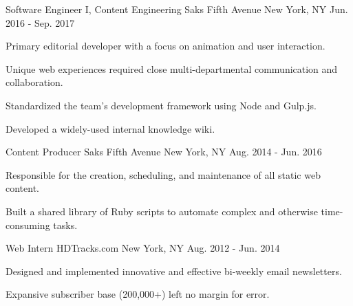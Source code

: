 \begin{cventries}
  \cventry
    {Software Engineer I, Content Engineering} %
    {Saks Fifth Avenue} %
    {New York, NY} %
    {Jun. 2016 - Sep. 2017} %
    {
      \begin{cvitems} %
       \item {Primary editorial developer with a focus on animation and user interaction.}
       \item {Unique web experiences required close multi-departmental communication and collaboration.}
       \item {Standardized the team's development framework using Node and Gulp.js.}
       \item {Developed a widely-used internal knowledge wiki.}
      \end{cvitems}
    }    

  \cventry
    {Content Producer} %
    {Saks Fifth Avenue} %
    {New York, NY} %
    {Aug. 2014 - Jun. 2016} %
    {
      \begin{cvitems} %
        \item {Responsible for the creation, scheduling, and maintenance of all static web content.}
        \item {Built a shared library of Ruby scripts to automate complex and otherwise time-consuming tasks.}
      \end{cvitems}
    }

  \cventry
    {Web Intern} %
    {HDTracks.com} %
    {New York, NY} %
    {Aug. 2012 - Jun. 2014} %
    {
      \begin{cvitems} %
        \item {Designed and implemented innovative and effective bi-weekly email newsletters.}
        \item {Expansive subscriber base (200,000+) left no margin for error.}
      \end{cvitems}
    }


\end{cventries}
